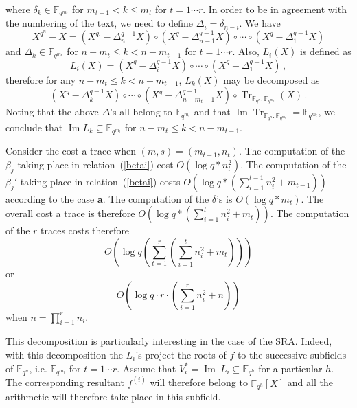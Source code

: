 \documentclass{sig-alternate}
\newcommand{\ff}[1]{\mathbb{F}_{#1}}
\newcommand{\qq}{q}
\newcommand{\nn}{n}
\newcommand{\qn}{{\qq^\nn}}
\newcommand{\extf}{\ff{\qn}}
\DeclareMathOperator{\Tr}{Tr}
\DeclareMathOperator{\Ima}{Im}
\newcommand{\tr}[2]{\Tr_{\ff{#1}:\ff{#2}}}
\newcommand{\bigO}{O}
\begin{document}
where $\delta_k \in \mathbb{F}_{\qq^{m_t}}$ for $m_{t-1}  < k \le m_t$ for $t=1 \cdots r$. In order to be in agreement with the numbering of the text, we need to define $\Delta_i=\delta_{n-i}$.
We have
$$X^{\qq^{\nn}}-X=(X^{\qq.} -\Delta_n^{\qq-1} X ) \circ (X^{\qq} -\Delta_{n-1}^{\qq-1} X ) \circ \cdots \circ (X^{\qq} -\Delta_1^{\qq-1} X )$$
and $\Delta_k \in \mathbb{F}_{\qq^{m_t}}$ for $n-m_{t}  \le  k < n- m_{t-1}$ for $t=1 \cdots r$.
Also, $L_i(X)$ is defined as 
$$L_i(X)= (X^q-\Delta_i^{q-1} X) \circ \cdots \circ (X^q-\Delta_1^{q-1} X)\,,$$
therefore for any $n-m_t \le k < n-m_{t-1}$, $L_k(X)$ may be decomposed as
$$(X^q-\Delta_k^{q-1}X) \circ \cdots \circ (X^q-\Delta_{n-m_t+1}^{q-1}X) \circ  \tr{\qq^{n}}{\qq^{m_t}}(X)\,.$$
Noting that the above $\Delta$'s all belong to $\mathbb{F}_{\qq^{m_t}}$ and that $\Ima \tr{\qq^{n}}{\qq^{m_t}}=\mathbb{F}_{\qq^{m_t}}$, we conclude that $\Ima L_k \subseteq \mathbb{F}_{\qq^{m_t}}$ for $n-m_{t}  \le  k < n- m_{t-1}$.

\medskip

 Consider the cost a trace when $(m,s)=(m_{t-1},n_t)$. The computation of the $\beta_j$ taking place in relation~(\ref{betai}) cost $\bigO(\log q * n_t^2)$. The computation of the $\beta_j'$ taking place in relation~(\ref{betai}) costs $\bigO(\log q * (\sum_{i=1}^{t-1}  n_i^2 + m_{t-1} ) )$ according to the case {\bf a}. The computation of the $\delta$'s is 
$\bigO(\log q * m_t)$. The overall cost a trace is therefore $\bigO(\log q * (\sum_{i=1}^{t}  n_i^2 + m_{t} ) )$. The computation of the $r$ traces costs therefore 
$$\bigO\left( \log q \left( \sum_{t=1}^r (\sum_{i=1}^{t}  n_i^2 + m_{t})\right) \right)$$ 
or 
$$\bigO\left(\log q \cdot r   \cdot \left(\sum_{i=1}^{r} n_i^2 + n\right)\right)$$ 
when $n=\prod_{i=1}^r n_i$. 


\medskip

 This decomposition is particularly interesting in the case of the SRA. Indeed, with this decomposition the $L_i$'s project the roots of $f$ to the successive subfields of $\extf$, i.e.  $\mathbb{F}_{\qq^{m_t}}$ for $t=1 \cdots r$.
 Assume that $V_i^\ast=\Ima~L_i \subseteq \mathbb{F}_{\qq^h}$ for a particular $h$. The corresponding resultant $f^{(i)}$ will therefore belong to $\mathbb{F}_{\qq^h}[X]$ and all the arithmetic will therefore take place in this subfield.
  



\end{document}
